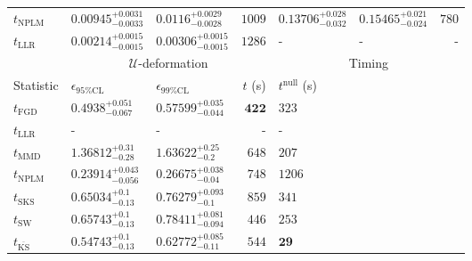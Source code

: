 \begin{tabular}{l|llr|llr}
\rowcolor{red!35}	$t_{\mathrm{NPLM}}$ & $0.00945_{-0.0033}^{+0.0031}$ & $0.0116_{-0.0028}^{+0.0029}$ & $1009$ & $0.13706_{-0.032}^{+0.028}$ & $0.15465_{-0.024}^{+0.021}$ & $780$ \\
	$t_{\mathrm{LLR}}$ & $0.00214_{-0.0015}^{+0.0015}$ & $0.00306_{-0.0015}^{+0.0015}$ & $1286$ & - & - & - \\
	\toprule
	\multicolumn{1}{c}{} & \multicolumn{3}{c}{$\mathcal{U}$-deformation} & \multicolumn{3}{c}{Timing} \\
	Statistic & $\epsilon_{95\%\mathrm{CL}}$ & $\epsilon_{99\%\mathrm{CL}}$ & $t$ (s) & $t^{\mathrm{null}}$ (s) \\
	\midrule
	$t_{\mathrm{FGD}}$ & ${\mathbf{0.4938_{-0.067}^{+0.051}}}$ & ${\mathbf{0.57599_{-0.044}^{+0.035}}}$ & ${\mathbf{422}}$ & $323$ \\
	$t_{\mathrm{LLR}}$ & - & - & - & - \\
	$t_{\mathrm{MMD}}$ & $1.36812_{-0.28}^{+0.31}$ & $1.63622_{-0.2}^{+0.25}$ & $648$ & $207$ \\
\rowcolor{red!35}	$t_{\mathrm{NPLM}}$ & $0.23914_{-0.056}^{+0.043}$ & $0.26675_{-0.04}^{+0.038}$ & $748$ & $1206$ \\
	$t_{\mathrm{SKS}}$ & $0.65034_{-0.13}^{+0.1}$ & $0.76279_{-0.1}^{+0.093}$ & $859$ & $341$ \\
	$t_{\mathrm{SW}}$ & $0.65743_{-0.13}^{+0.1}$ & $0.78411_{-0.094}^{+0.081}$ & $446$ & $253$ \\
	$t_{\overline{\mathrm{KS}}}$ & $0.54743_{-0.13}^{+0.1}$ & $0.62772_{-0.11}^{+0.085}$ & $544$ & ${\mathbf{29}}$ \\
	\bottomrule
\end{tabular}